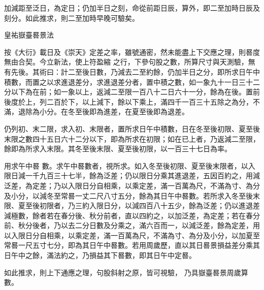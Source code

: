 \begin{pinyinscope}
 加減距至泛日，為定日；仍加半日之刻，命從前距日辰，算外，即二至加時日辰及刻分。如此推求，則二至加時早晚可驗矣。



 皇祐嶽臺晷景法



 按《大衍》載日及《崇天》定差之率，雖號通密，然未能盡上下交應之理，則晷度無由合契。今立新法，使上符盈縮
 之行，下參句股之數，所算尺寸與天測驗，無有先後。其術曰：計二至後日數，乃減去二至約餘，仍加半日之分，即所求日午中積數，而置之以求進退差分，求進退差分者，置中積之數，如一象九十一日三十二分以下為在前；如一象以上，返減二至限一百八十二日六十一分，餘為在後。置前後度於上，列二百於下，以上減下，餘以下乘上，滿四千一百三十五除之為分，不滿，退除為小分。在冬至後即為進差，在夏至後即為退差。



 仍列初、末二限，求入初、末限者，置所求日午中積數，日在冬至後初限、夏至後末限之數四十五日六十二分以下，即為所求在初限；如在已上者，乃返減二至限，餘即為所求入末限。其冬至後末限、夏至後初限，以一百三十七日為率。



 用求午中晷
 數。求午中晷數者，視所求。如入冬至後初限、夏至後末限者，以入限日減一千九百三十七半，餘為泛差；仍以限日分乘其進退差，五因百約之，用減泛差，為定差；乃以入限日分自相乘，以乘定差，滿一百萬為尺，不滿為寸、為分及小分，以減冬至常晷一丈二尺八寸五分，餘為其日午中晷數。若所求入冬至後末限、夏至後初限者，乃三約入限日分，以減四百八十五少，餘為泛差；仍以進退差減極數，餘者若在春分後、秋分前者，直以四約之，以加泛差，為定差；若在春分前、秋分後者，乃以去二分日數及分乘之，滿六百而一，以減泛差，餘為定差，用以入限日分自相乘，以乘定差，滿一百萬為尺，不滿為寸、為分及小分，以加夏至常晷一尺五寸七分，即為其日午中晷數。若用周歲歷，直以其日晷景損益差分乘其日午中之餘，滿法約之，乃損益其下晷數，即其日午中定晷。



 如此推求，則上下通應之理，句股斜射之原，皆可視驗，
 乃具嶽臺晷景周歲算數。



\end{pinyinscope}